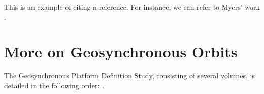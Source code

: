 \documentclass{article}
\begin{document}
This is an example of citing a reference. For instance, we can refer to Myers' work \cite{Myers1973_ExecSummary}.

\section{More on Geosynchronous Orbits}
The \href{https://ntrs.nasa.gov/search?q=Geosynchronous\%20platform\%20definition\%20study}{Geosynchronous Platform Definition Study}, consisting of several volumes, is detailed in the following order: 
\cite{Myers1973_ExecSummary, Myers1973_ProgramEvaluation, Myers1973_NewTrafficModel, Myers1973_StudySummary, Myers1973_PlatformSynthesis, Myers1973_BaselineTraffic}.

\nocite{*}
\printbibliography
\end{document}
